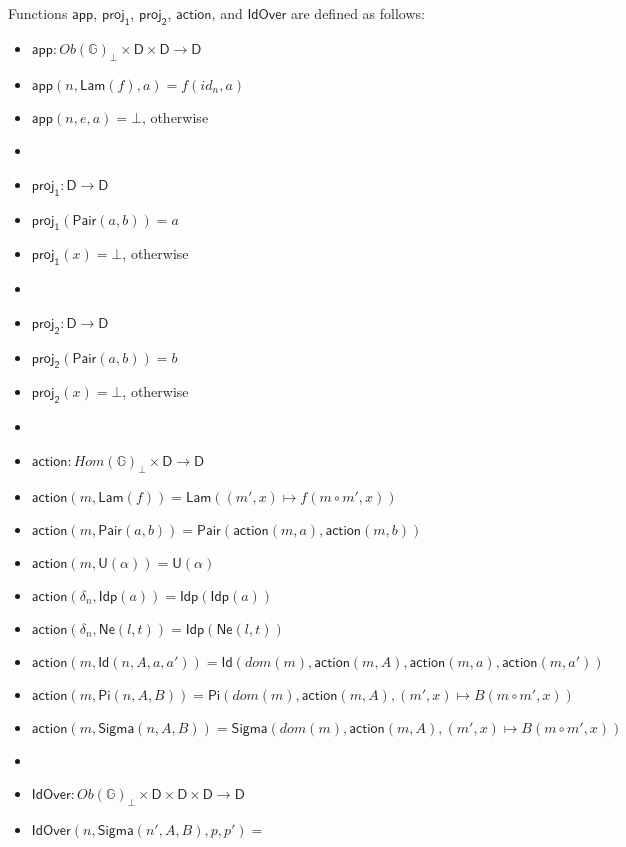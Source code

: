 \documentclass{amsart}
\theoremstyle{definition}
\theoremstyle{remark}
\newcommand{\D}{\mathsf{D}}
\newcommand{\bbG}{\mathbb{G}}
\numberwithin{table}{section}
\begin{document}
Functions $\mathsf{app}$, $\mathsf{proj_1}$, $\mathsf{proj_2}$, $\mathsf{action}$, and $\mathsf{IdOver}$ are defined as follows:
\begin{itemize}
\item[] $\mathsf{app} : Ob(\bbG)_\bot \times \D \times \D \to \D$
\item[] $\mathsf{app}(n,\mathsf{Lam}(f),a) = f(id_n,a)$
\item[] $\mathsf{app}(n,e,a) = \bot$, otherwise
\item[]
\item[] $\mathsf{proj_1} : \D \to \D$
\item[] $\mathsf{proj_1}(\mathsf{Pair}(a,b)) = a$
\item[] $\mathsf{proj_1}(x) = \bot$, otherwise
\item[]
\item[] $\mathsf{proj_2} : \D \to \D$
\item[] $\mathsf{proj_2}(\mathsf{Pair}(a,b)) = b$
\item[] $\mathsf{proj_2}(x) = \bot$, otherwise
\item[]
\item[] $\mathsf{action} : Hom(\bbG)_\bot \times \D \to \D$
\item[] $\mathsf{action}(m, \mathsf{Lam}(f)) = \mathsf{Lam}((m',x) \mapsto f(m \circ m', x))$
\item[] $\mathsf{action}(m, \mathsf{Pair}(a, b)) = \mathsf{Pair}(\mathsf{action}(m, a), \mathsf{action}(m, b))$
\item[] $\mathsf{action}(m, \mathsf{U}(\alpha)) = \mathsf{U}(\alpha)$
\item[] $\mathsf{action}(\delta_n, \mathsf{Idp}(a)) = \mathsf{Idp}(\mathsf{Idp}(a))$
\item[] $\mathsf{action}(\delta_n, \mathsf{Ne}(l, t)) = \mathsf{Idp}(\mathsf{Ne}(l, t))$
\item[] $\mathsf{action}(m, \mathsf{Id}(n, A, a, a')) = \mathsf{Id}(dom(m), \mathsf{action}(m, A), \mathsf{action}(m, a), \mathsf{action}(m, a'))$
\item[] $\mathsf{action}(m, \mathsf{Pi}(n, A, B)) = \mathsf{Pi}(dom(m), \mathsf{action}(m, A), (m', x) \mapsto B(m \circ m', x))$
\item[] $\mathsf{action}(m, \mathsf{Sigma}(n, A, B)) = \mathsf{Sigma}(dom(m), \mathsf{action}(m, A), (m', x) \mapsto B(m \circ m', x))$
\item[]
\item[] $\mathsf{IdOver} : Ob(\bbG)_\bot \times \D \times \D \times \D \to \D$
\item[] $\mathsf{IdOver}(n, \mathsf{Sigma}(n', A, B), p, p') =$ \\

\end{itemize}
\end{document}
